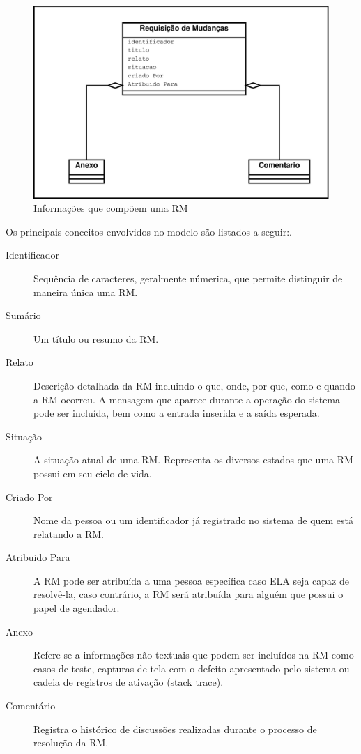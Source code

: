 \begin{figure}[htpb]
	\centering
	\includegraphics[width=0.8\linewidth]{./chapter-manutencao-software-visao-geral/img/diagrama-classe-atributos-requisicao-mudancas.pdf}
	\caption{Informações que compõem uma RM}
	\label{fig:diagrama-classe-atributos-requisicao-mudancas}
\end{figure}

Os principais conceitos envolvidos no modelo são listados  a seguir:.

\begin{description}
	\item [Identificador] Sequência de caracteres,  geralmente númerica,  que
		permite distinguir de maneira única uma RM.
	\item [Sumário] Um título ou resumo da RM.
	\item [Relato] Descrição detalhada da RM incluindo o que, onde, por que,
		como e quando a RM ocorreu. A mensagem que aparece durante a operação do
		sistema pode ser incluída, bem como a entrada inserida e a saída
		esperada.
	\item [Situação] A situação atual de uma RM\@. Representa os diversos estados
		que uma RM possui em seu ciclo de vida.
	\item [Criado Por] Nome da pessoa ou um identificador  já registrado no
		sistema de quem está relatando a RM\@.
	\item [Atribuido Para] A RM pode ser atribuída a uma pessoa específica caso
		ELA seja capaz de resolvê-la, caso contrário, a RM será atribuída para
		alguém que possui o papel de agendador.
	\item [Anexo] Refere-se a informações não textuais que podem ser incluídos
		na RM como casos de teste, capturas de tela com o defeito apresentado
		pelo sistema ou cadeia de registros de ativação (stack trace).
	\item [Comentário] Registra o histórico de discussões realizadas durante o
		processo de resolução da RM\@.
\end{description}

